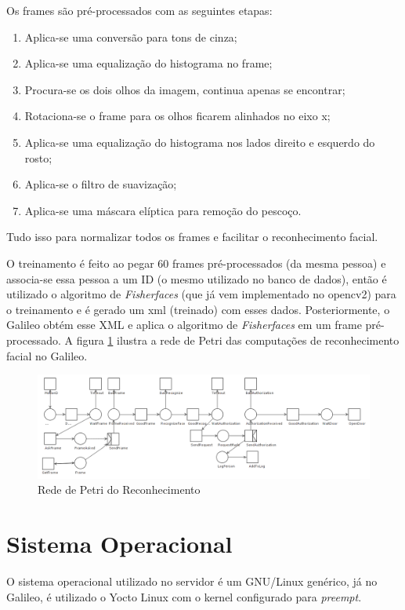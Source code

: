 \documentclass[12pt]{article}
\begin{document}
    Os frames são pré-processados com as seguintes etapas:
    \begin{enumerate}
        \item Aplica-se uma conversão para tons de cinza;
        \item Aplica-se uma equalização do histograma no frame;
        \item Procura-se os dois olhos da imagem, continua apenas se encontrar;
        \item Rotaciona-se o frame para os olhos ficarem alinhados no eixo x;
        \item Aplica-se uma equalização do histograma nos lados direito e
        esquerdo do rosto;
        \item Aplica-se o filtro de suavização;
        \item Aplica-se uma máscara elíptica para remoção do pescoço.
    \end{enumerate}
     Tudo isso para normalizar todos os frames e facilitar o reconhecimento
     facial.

     O treinamento é feito ao pegar 60 frames pré-processados (da mesma pessoa)
     e associa-se essa pessoa a um ID (o mesmo utilizado no banco de dados),
     então é utilizado o algoritmo de \textit{Fisherfaces} (que já vem
     implementado no opencv2) para o treinamento e é gerado um xml (treinado)
     com esses dados. Posteriormente, o Galileo obtém esse XML e aplica o
     algoritmo de \textit{Fisherfaces} em um frame pré-processado. A figura
     \ref{fig:petri-reconhecimento} ilustra a rede de Petri das computações
     de reconhecimento facial no Galileo.

     \begin{figure}[ht]
		\centering
		\includegraphics[width=1\textwidth]{petri-reconhecimento.png}
		\caption{Rede de Petri do Reconhecimento}
		\label{fig:petri-reconhecimento}
	\end{figure}

\section{Sistema Operacional}
    O sistema operacional utilizado no servidor é um GNU/Linux genérico, já no
    Galileo, é utilizado o Yocto Linux com o kernel configurado para
    \textit{preempt}.
\end{document}
